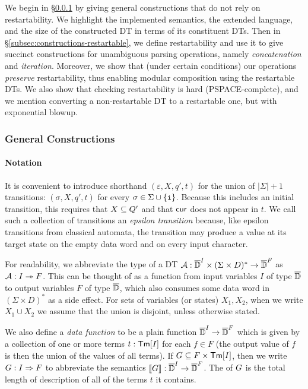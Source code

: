 We begin in \S\ref{subsec:constructions-general} by giving general constructions that do not rely on restartability. We highlight the implemented semantics, the extended language, and the size of the constructed DT in terms of its constituent DTs.
Then in \S\ref{subsec:constructions-restartable}, we define restartability and use it to give succinct constructions for unambiguous parsing operations, namely \emph{concatenation} and \emph{iteration}.
Moreover, we show that (under certain conditions) our operations \emph{preserve} restartability, thus enabling modular composition using the restartable DTs. We also show that checking restartability is hard (PSPACE-complete), and we mention converting a non-restartable DT to a restartable one, but with exponential blowup.

\subsubsection{General Constructions}
\label{subsec:constructions-general}

\paragraph*{Notation}
It is convenient to introduce shorthand $(\varepsilon, X, q', t)$ for the union of $|\Sigma| + 1$ transitions: $(\sigma, X, q', t)$ for every $\sigma \in \Sigma \cup \{{\texttt{i}}\}$. Because this includes an initial transition, this requires that $X \subseteq Q'$ and that $\mathsf{cur}$ does not appear in $t$. We call such a collection of transitions an \emph{epsilon transition} because, like epsilon transitions from classical automata, the transition may produce a value at its target state on the empty data word and on every input character.

For readability, we abbreviate the type of a DT
$\mathcal{A}: \overline{\mathbb{D}{}}^I \times (\Sigma \times D)^* \to \overline{\mathbb{D}{}}^F$ as $\mathcal{A}: I \twoheadrightarrow F$.
This can be thought of as a function from input variables $I$ of type $\overline{\mathbb{D}{}}$ to output variables $F$ of type $\overline{\mathbb{D}{}}$, which also consumes some data word in $(\Sigma \times D)^*$ as a side effect.
For sets of variables (or states) $X_1, X_2$, when we write $X_1 \cup X_2$ we assume that the union is disjoint, unless otherwise stated.

We also define a \emph{data function} to be a plain function $\overline{\mathbb{D}{}}^I \to \overline{\mathbb{D}{}}^F$ which is
given by a collection of one or more terms $t : \textsf{Tm}[I]$ for each $f \in F$ (the output value of $f$ is then the union of the values of all terms). If $G \subseteq F \times \textsf{Tm}[I]$, then we write $G: I \Rightarrow F$ to abbreviate the semantics $\llbracket G \rrbracket: \overline{\mathbb{D}{}}^I \to \overline{\mathbb{D}{}}^F$.
The  of $G$ is the total length of description of all of the terms $t$ it contains.

